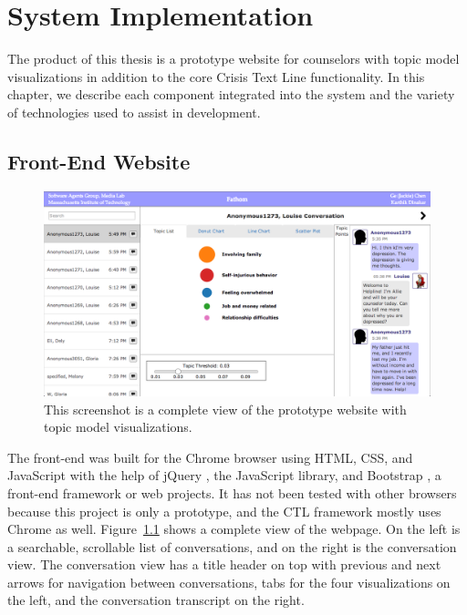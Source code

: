 \chapter{System Implementation}

The product of this thesis is a prototype website for counselors with topic model
visualizations in addition to the core Crisis Text Line functionality. In this chapter,
we describe each component integrated into the system and the variety of
technologies used to assist in development.

\section{Front-End Website}

\begin{figure}[h]
  \centering
    \includegraphics[width=\textwidth]{website.png}
  \caption{This screenshot is a complete view of the prototype website with topic
  model visualizations.}
  \label{website}
\end{figure}

The front-end was built for the Chrome browser using HTML, CSS, and JavaScript
with the help of jQuery \cite{jquery}, the JavaScript library, and Bootstrap \cite{bootstrap}, a front-end
framework or web projects. It has not been tested with other browsers because this
project is only a prototype, and the CTL framework mostly uses Chrome as well.
Figure~\ref{website} shows a complete view of the webpage. On the left is a searchable, scrollable
list of conversations, and on the right is the conversation view. The conversation view
has a title header on top with previous and next arrows for navigation between
conversations, tabs for the four visualizations on the left, and the conversation transcript
on the right.

